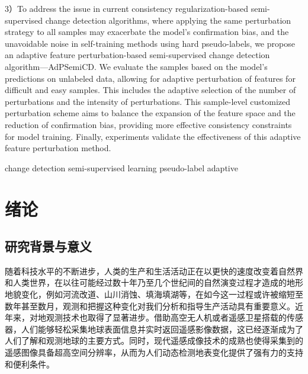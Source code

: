 \documentclass[lang=chs, degree=master, blindreview=false, adobe=false]{yanputhesis}
\begin{document}
\begin{engabstract}
  3）To address the issue in current consistency regularization-based semi-supervised change detection algorithms, where applying the same perturbation strategy to all samples may exacerbate the model’s confirmation bias, and the unavoidable noise in self-training methods using hard pseudo-labels, we propose an adaptive feature perturbation-based semi-supervised change detection algorithm—AdPSemiCD. We evaluate the samples based on the model's predictions on unlabeled data, allowing for adaptive perturbation of features for difficult and easy samples. This includes the adaptive selection of the number of perturbations and the intensity of perturbations. This sample-level customized perturbation scheme aims to balance the expansion of the feature space and the reduction of confirmation bias, providing more effective consistency constraints for model training. Finally, experiments validate the effectiveness of this adaptive feature perturbation method.
    \begin{engkeywords}                                     %
        change detection \ensep semi-supervised learning \ensep pseudo-label     \ensep      adaptive     %
    \end{engkeywords}                                       %
\end{engabstract}                                           %
\tableofcontents                                            %
\listoffigures                                              %
\listoftables                                               %
\printnomenclature                                          %
\mainmatter
\sDefault
\chapter{绪论}
\section{研究背景与意义}
随着科技水平的不断进步，人类的生产和生活活动正在以更快的速度改变着自然界和人类世界，在以往可能经过数十年乃至几个世纪间的自然演变过程才造成的地形地貌变化，例如河流改道、山川消蚀、填海填湖等，在如今这一过程或许被缩短至数年甚至数月，观测和把握这种变化对我们分析和指导生产活动具有重要意义。近年来，对地观测技术也取得了显著进步。借助高空无人机或者遥感卫星搭载的传感器，人们能够轻松采集地球表面信息并实时返回遥感影像数据，这已经逐渐成为了人们了解和观测地球的主要方式。同时，现代遥感成像技术的成熟也使得采集到的遥感图像具备超高空间分辨率，从而为人们动态检测地表变化提供了强有力的支持和便利条件。
\end{document}
